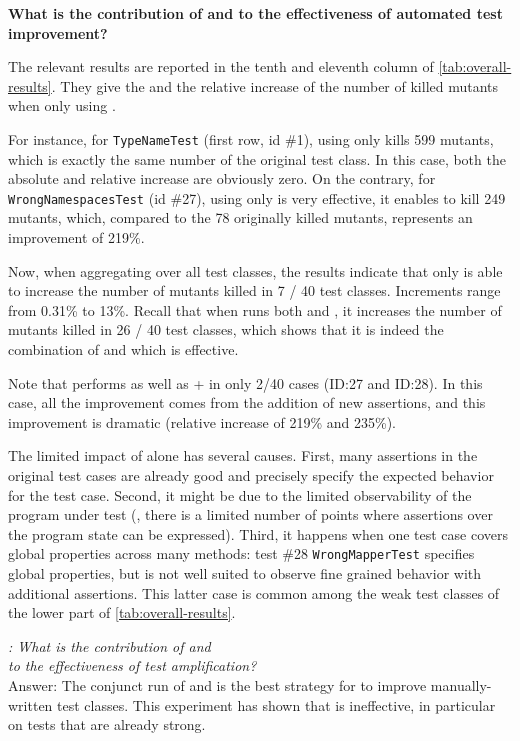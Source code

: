 \textbf{What is the contribution of \Iampl and \Aampl to the effectiveness of automated test improvement?}

The relevant results are reported in the tenth and eleventh column of \autoref{tab:overall-results}.
They give the \ams and the relative increase of the number of killed mutants when only using \Aampl.

For instance, for \texttt{TypeNameTest} (first row, id \#1), using only \Aampl kills 599 mutants, which is exactly the same number of the original test class. 
In this case, both the absolute and relative increase are obviously zero.
On the contrary, for \texttt{WrongNamespacesTest} (id \#27), using only \Aampl is very effective, it enables \dspot to kill 249 mutants, which, compared to the 78 originally killed mutants, represents an improvement of 219\%. 

Now, when aggregating over all test classes, the results indicate that \Aampl only is able to increase the number of mutants killed in 7 / 40 test classes. 
Increments range from 0.31\% to 13\%. 
Recall that when \dspot runs both \Iampl{} and \Aampl, it increases the number of mutants killed in 26 / 40 test classes, which shows that it is indeed the combination of \Aampl and \Iampl which is effective.

Note that \Aampl performs as well as \Iampl + \Aampl in only 2/40 cases (ID:27 and ID:28). 
In this case, all the improvement comes from the addition of new assertions, and this improvement is dramatic (relative increase of 219\% and 235\%).

The limited impact of \Aampl alone has several causes. 
First, many assertions in the original test cases are already good and precisely specify the expected behavior for the test case.
Second, it might be due to the limited observability of the program under test (\ie, there is a limited number of points where assertions over the program state can be expressed).
Third, it happens when one test case covers global properties across many methods: test \#28 \texttt{WrongMapperTest} specifies global properties, but is not well suited to observe fine grained behavior with additional assertions. 
This latter case is common among the weak test classes of the lower part of \autoref{tab:overall-results}.
\
~\\

\begin{mdframed}
	\textit{\rqAmplVersusIAmpl: What is the contribution of \Iampl{} and \\\Aampl{} to the effectiveness of test amplification?}\\
	Answer: The conjunct run of \Iampl{} and \Aampl{} is the best strategy for \dspot{} to improve manually-written test classes. 
	This experiment has shown that \Aampl{} is ineffective, in particular on tests that are already strong.
\end{mdframed}
~\\

